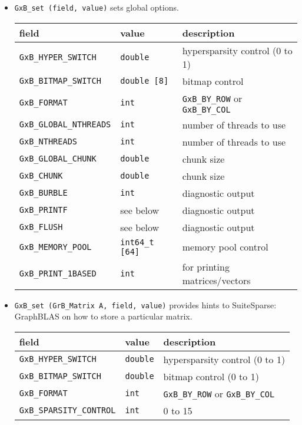 \documentclass[12pt]{article}
\begin{document}
\begin{itemize}

\item \verb'GxB_set (field, value)' sets global options.

{\footnotesize
\begin{tabular}{lll}
field                       & value         & description \\
\hline
\verb'GxB_HYPER_SWITCH'     & \verb'double' & hypersparsity control (0 to 1) \\
\verb'GxB_BITMAP_SWITCH'    & \verb'double [8]' & bitmap control \\
\verb'GxB_FORMAT'           & \verb'int'    & \verb'GxB_BY_ROW'
                                              or \verb'GxB_BY_COL' \\
\verb'GxB_GLOBAL_NTHREADS'  & \verb'int'    & number of threads to use \\
\verb'GxB_NTHREADS'         & \verb'int'    & number of threads to use \\
\verb'GxB_GLOBAL_CHUNK'     & \verb'double' & chunk size \\
\verb'GxB_CHUNK'            & \verb'double' & chunk size \\
\verb'GxB_BURBLE'           & \verb'int'    & diagnostic output \\
\verb'GxB_PRINTF'           & see below     & diagnostic output \\
\verb'GxB_FLUSH'            & see below     & diagnostic output \\
\verb'GxB_MEMORY_POOL'      & \verb'int64_t [64]' & memory pool control \\
\verb'GxB_PRINT_1BASED'     & \verb'int'    & for printing matrices/vectors \\
\hline
\end{tabular}
}

\item \verb'GxB_set (GrB_Matrix A, field, value)' provides hints to
    SuiteSparse: GraphBLAS on how to store a particular matrix.

{\footnotesize
\begin{tabular}{lll}
field                       & value         & description \\
\hline
\verb'GxB_HYPER_SWITCH'     & \verb'double' & hypersparsity control (0 to 1) \\
\verb'GxB_BITMAP_SWITCH'    & \verb'double' & bitmap control (0 to 1) \\
\verb'GxB_FORMAT'           & \verb'int'    & \verb'GxB_BY_ROW'
                                              or \verb'GxB_BY_COL' \\
\verb'GxB_SPARSITY_CONTROL' & \verb'int'    & 0 to 15 \\
\hline
\end{tabular}
}


\end{itemize}
\end{document}
